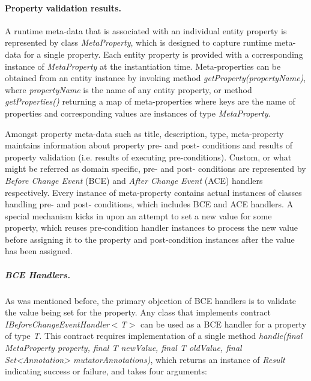   \paragraph*{Property validation results.}

  A runtime meta-data that is associated with an individual entity property is represented by class \emph{MetaProperty}, which is designed to capture runtime meta-data for a single property.
  Each entity property is provided with a corresponding instance of \emph{MetaProperty} at the instantiation time.
  Meta-properties can be obtained from an entity instance by invoking method \emph{getProperty(propertyName)}, where \emph{propertyName} is the name of any entity property, or method \emph{getProperties()} returning a map of meta-properties where keys are the name of properties and corresponding values are instances of type \emph{MetaProperty}.

  Amongst property meta-data such as title, description, type, meta-property maintains information about property pre- and post- conditions and results of property validation (i.e. results of executing pre-conditions).
  Custom, or what might be referred as domain specific, pre- and post- conditions are represented by \emph{Before Change Event} (BCE) and \emph{After Change Event} (ACE) handlers respectively.
  Every instance of meta-property contains actual instances of classes handling pre- and post- conditions, which includes BCE and ACE handlers.
  A special mechanism kicks in upon an attempt to set a new value for some property, which reuses pre-condition handler instances to process the new value before assigning it to the property and post-condition instances after the value has been assigned.

  \subparagraph*{BCE Handlers.}
  As was mentioned before, the primary objection of BCE handlers is to validate the value being set for the property.
  Any class that implements contract \emph{IBeforeChangeEventHandler$<$T$>$} can be used as a BCE handler for a property of type \emph{T}.
  This contract requires implementation of a single method \emph{handle(final MetaProperty property, final T newValue, final T oldValue, final Set<Annotation> mutatorAnnotations)}, which returns an instance of \emph{Result} indicating success or failure, and takes four arguments:

